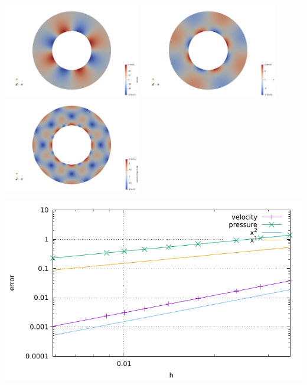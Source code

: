 \includegraphics[width=6cm]{python_codes/fieldstone_annulus/density}
\includegraphics[width=6cm]{python_codes/fieldstone_annulus/pressure}
\includegraphics[width=6cm]{python_codes/fieldstone_annulus/velocity}

\includegraphics[width=16cm]{python_codes/fieldstone_annulus/errors}

